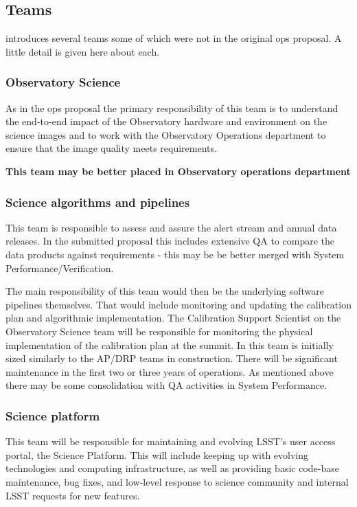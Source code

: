 \newpage
\subsection{Teams }\label{sec:teams}
 introduces several teams some of which were not in the original ops proposal. A little detail is given here about each.

\subsubsection{Observatory Science}
As in the ops proposal the primary responsibility of this team is to understand the end-to-end impact of the Observatory hardware and environment on the science images and to work with the Observatory \gls{Operations} department to ensure that the image quality meets requirements.

\textbf{This team may be better placed  in Observatory operations department }

\subsubsection{Science algorithms and pipelines}
This team is responsible to assess and assure the alert stream and annual data releases.
In the submitted proposal this includes extensive \gls{QA} to compare the data products against requirements -
this may be be better merged with System Performance/Verification.

The main responsibility  of this team  would then be the  underlying \gls{software} pipelines themselves.
That would include monitoring and updating the \gls{calibration} plan and algorithmic implementation. The Calibration Support Scientist on the Observatory Science team will be responsible for monitoring the physical implementation of the \gls{calibration} plan at the summit.
In  this team is initially sized similarly to the AP/DRP teams in construction. There will be significant maintenance in the first two or three years of operations. As mentioned above there may be some consolidation with \gls{QA} activities in System Performance.

\subsubsection{Science platform  }
This team will be responsible for maintaining and evolving LSST’s user access portal, the \gls{Science Platform}. This will include keeping up with evolving technologies and computing infrastructure, as well as providing basic code-base maintenance, bug fixes, and low-level response to science community and internal \gls{LSST} requests for new features.

